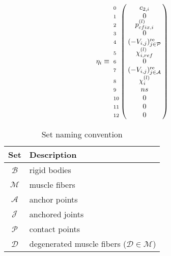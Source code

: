 \documentclass[a4paper,10pt]{article}
\begin{document}
\begin{landscape}
\begin{equation}\notag
\eta_i \equiv
\bordermatrix {
                 &                                              \cr
\scriptstyle{0}  &   c_{2,i}                                    \cr
\scriptstyle{1}  &   0                                          \cr
\scriptstyle{2}  &   p_{cfix, i}^{(l)}                          \cr
\scriptstyle{3}  &   0                                          \cr
\scriptstyle{4}  &   (-V_{i,j})_{j \in \mathcal{P}}^\text{re}   \cr
\scriptstyle{5}  &   \chi^{(l)}_{i,ref}                         \cr
\scriptstyle{6}  &   0                                          \cr
\scriptstyle{7}  &   (-V_{i,j})_{j \in \mathcal{A}}^\text{re}   \cr
\scriptstyle{8}  &   \chi^{(l)}_{i}                             \cr
\scriptstyle{9}  &   ns                                         \cr
\scriptstyle{10} &  0                                           \cr
\scriptstyle{11} &  0                                           \cr
\scriptstyle{12} &  0                                           \cr
}
\end{equation}

\begin{table}[h!b!p!]
\caption{Set naming convention}
\centering
\begin{tabular}{ c l }
\hline
Set              & Description                                                \\
\hline
$\mathcal{B}$    & rigid bodies                                               \\
$\mathcal{M}$    & muscle fibers                                              \\
$\mathcal{A}$    & anchor points                                              \\
$\mathcal{J}$    & anchored joints                                            \\
$\mathcal{P}$    & contact points                                             \\
$\mathcal{D}$    & degenerated muscle fibers ($\mathcal{D} \in \mathcal{M}$)  \\
\hline
\end{tabular}
\end{table}

\end{landscape}
\end{document}
